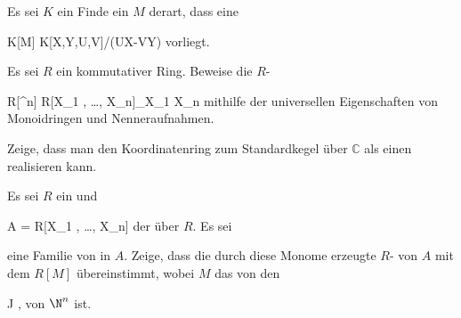 {}
{





Es sei $K$ ein
Finde ein
$M$ derart, dass eine

\mavergleichskettedisp
{\vergleichskette
{ K[M]
}
{ \cong} { K[X,Y,U,V]/(UX-VY)
}
{ } {
}
{ } {
}
{ } {
}
}
{}{}{}
vorliegt.





}
{} {}

{}
{





Es sei $R$ ein kommutativer Ring. Beweise die
$R$-

\mavergleichskettedisp
{\vergleichskette
{ R[\Z^n]
}
{ \cong} { R[X_1 , \ldots ,  X_n]_{X_1 \cdots X_n }
}
{ } {
}
{ } {
}
{ } {
}
}
{}{}{}
mithilfe der universellen Eigenschaften von Monoidringen und Nenneraufnahmen.





}
{} {}

{}
{





Zeige, dass man den Koordinatenring zum Standardkegel
 über ${\mathbb C}$ als einen
realisieren kann.





}
{} {}

{}
{





Es sei $R$ ein
und

\mavergleichskette
{\vergleichskette
{ A
}
{ = }{ R[X_1 , \ldots , X_n]
}
{  }{
}
{    }{
}
{   }{
}
}
{}{}{}
der
über $R$. Es sei

 {  }

eine Familie von
in $A$. Zeige, dass die durch diese Monome erzeugte
$R$-
von $A$ mit dem
$R[M]$ übereinstimmt, wobei $M$ das von den

\mathbed {\nu} {}
 {\nu \in J} {}
 {} {} {} {,}
von $\N^n$ ist.





}
{} {}

